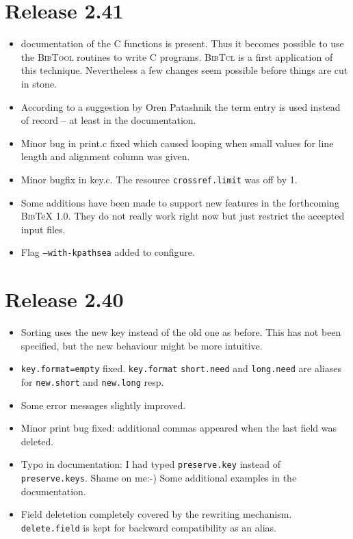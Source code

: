 \documentclass[11pt,a4paper]{scrartcl}
\newcommand\rsc[1]{\texttt{#1}}
\newcommand\File[1]{\textsf{#1}}
\newcommand\BibTool{\textsc{BibTool}}
\newcommand\BibTcl{\textsc{BibTcl}}
\newcommand\BibTeX{\textsc{Bib}\TeX}
\newenvironment{Release}[2]{%
  \def\tmp{#2}%
  \section*{Release #1 \ifx\tmp\empty\else{\normalsize[#2]}\fi}
  \begin{itemize}
}{\end{itemize}}
\newenvironment{Fix}[1]{\item }{}
\newenvironment{New}[1]{\item }{}
\newenvironment{Doc}[1]{\item }{}
\newenvironment{Update}[1]{\item }{}
\begin{document}
\begin{multicols}
\begin{Release}{2.41}{}
\begin{Doc}{gene}
    documentation of the C functions is present. Thus it becomes possible to
    use the \BibTool{} routines to write C programs. \BibTcl{} is a first
    application of this technique. Nevertheless a few changes seem possible
    before things are cut in stone.
  \end{Doc}
  \begin{Doc}{gene}
    According to a suggestion by Oren Patashnik the term entry is used instead
    of record -- at least in the documentation.
  \end{Doc}
  \begin{Fix}{gene}
    Minor bug in \File{print.c} fixed which caused looping when small values
    for line length and alignment column was given.
  \end{Fix}
  \begin{Fix}{gene}
    Minor bugfix in \File{key.c}. The resource \rsc{crossref.limit} was
    off by 1.
  \end{Fix}
  \begin{New}{gene}
    Some additions have been made to support new features in the forthcoming
    \BibTeX{} 1.0. They do not really work right now but just restrict the
    accepted input files.
  \end{New}
  \begin{New}{gene}
    Flag \texttt{--with-kpathsea} added to configure.
  \end{New}
 \end{Release}

 \begin{Release}{2.40}{}
  \begin{New}{gene}
    Sorting uses the new key instead of the old one as before. This has not
    been specified, but the new behaviour might be more intuitive.
  \end{New}
  \begin{Fix}{gene}
    \rsc{key.format=empty} fixed. \rsc{key.format} \rsc{short.need}
    and \rsc{long.need} are aliases for \rsc{new.short} and
    \rsc{new.long} resp.
  \end{Fix}
  \begin{Update}{gene}
    Some error messages slightly improved.
  \end{Update}
  \begin{Fix}{gene}
    Minor print bug fixed: additional commas appeared when the last field was
    deleted.
  \end{Fix}
  \begin{Doc}{gene}
    Typo in documentation: I had typed \rsc{preserve.key} instead of
    \rsc{preserve.keys}. Shame on me:-) Some additional examples in the
    documentation.
  \end{Doc}
  \begin{Update}{gene}
    Field deletetion completely covered by the rewriting mechanism.
    \rsc{delete.field} is kept for backward compatibility as an alias.
  \end{Update}
 \end{Release}


\end{multicols}
\end{document}
